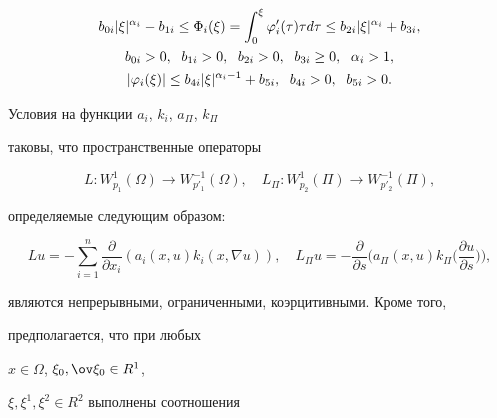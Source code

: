 \begin{gather} \label{eq6} 


b_{0i} | \xi |^{\alpha_{i}}-b_{1i} \leq \Phi_{i}(\xi)=\int_{0}^{\xi}


\varphi_{i}^{\prime}(\tau) \tau d \tau \leq 


b_{2i} | \xi |^{\alpha_{i}}+b_{3i}, \\


%


b_{0i} > 0,\ \; b_{1i} > 0,\ \; b_{2i} > 0,\ \; b_{3i} \ge 0, \ \;


\alpha_{i} > 1,\notag \\


%


\label{eq7} 


|\varphi_{i}(\xi)| \leq b_{4i}|\xi|^{ \alpha_{i}-1}+b_{5i}, 


\ \; b_{4i} > 0,\ \; b_{5i} >0.


\end{gather}





Условия на функции $a_{i}$, $k_{i}$, $a_{\Pi}$, $k_{\Pi}$


таковы, что пространственные операторы 


$$ 


L : W^{1}_{p_{1}}(\Omega) \rightarrow W^{-1}_{p'_1}(\Omega),\quad


L_{\Pi}: W^{1}_{p_{2}}(\Pi) \rightarrow W^{-1}_{p'_2}(\Pi),


$$


определяемые следующим образом:


$$ 


Lu=-\sum^{n}_{i=1} \frac{\partial}{\partial x_{i}}(a_{i}(x,u)


k_{i}(x,\nabla u)), \quad


L_{\Pi}u=- \frac{\partial}{\partial s}\bigg(a_{\Pi}(x,u)


k_{\Pi}\bigg(\frac{\partial u}{\partial s}\bigg)\bigg),


$$


являются непрерывными, ограниченными, коэрцитивными. Кроме того,


предполагается, что при любых 


$x \in \Omega$, $\xi_{0}, \ov \xi_{0} \in R^{1}$,


$\xi, \xi^{1}, \xi^{2} \in R^{2}$ выполнены соотношения


